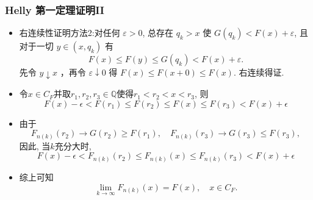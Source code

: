 \documentclass[Prob-All.tex]{subfiles}
\begin{document}
\begin{frame}
	\frametitle{{\rm Helly} 第一定理证明II}


\begin{itemize}[<+-|alert@+>]

\item 右连续性证明方法2:对任何 $\varepsilon>0$, 总存在 $q_{k}>x$ 使 $G\left(q_{k}\right)<F(x)+\varepsilon$, 且对于一切 $y \in\left(x, q_{k}\right)$ 有
\[
F(x)\leq F(y)\leq G\left(q_{k}\right)<F(x)+\varepsilon .
\]
先令 $y \downarrow x$ ，再令 $\varepsilon \downarrow 0$ 得 $F(x)\leq F(x+0) \leq F(x)$. 右连续得证.
\item 令$x\in C_F$并取$r_1,r_2,r_3\in\mathbb{Q}$使得$r_{1}<r_{2}<x<r_3$, 则
	\[
	F(x)-\epsilon<F\left(r_{1}\right) \leq F\left(r_{2}\right) \leq F(x) \leq F(r_3)<F(x)+\epsilon
	\]
\item 由于
 \[ F_{n(k)}\left(r_{2}\right) \rightarrow G\left(r_{2}\right) \geq F\left(r_{1}\right), \quad  F_{n(k)}(r_3) \rightarrow G(r_3) \leq F(r_3), \]
 \pause 因此, 当$k$充分大时,
	\[
	F(x)-\epsilon<F_{n(k)}\left(r_{2}\right) \leq F_{n(k)}(x) \leq F_{n(k)}(r_3)<F(x)+\epsilon
	\]
	\item 综上可知
	\[\lim_{k \rightarrow \infty}F_{n(k)}(x) = F(x), \quad x\in C_F.\]
\end{itemize}
\end{frame}
\end{document}
